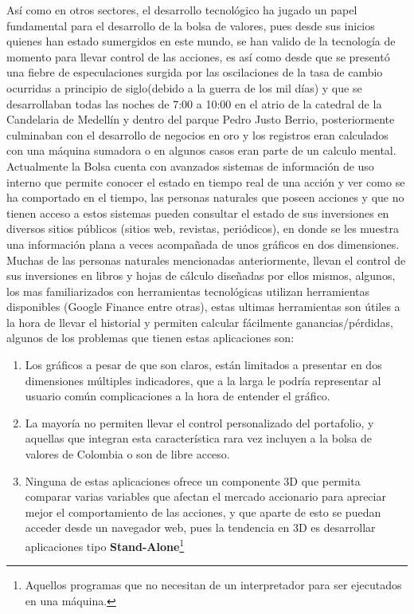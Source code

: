 \documentclass[twocolumn]{article}
\begin{document}
Así como en otros sectores, el desarrollo tecnológico ha jugado un papel fundamental para el desarrollo de la bolsa de valores, pues desde sus inicios quienes han estado sumergidos en este mundo, se han valido de la tecnología de momento para llevar control de las acciones, es así como desde que se presentó una fiebre de especulaciones surgida por las oscilaciones de la tasa de cambio ocurridas a principio de siglo(debido a la guerra de los mil días) y que se desarrollaban todas las noches de 7:00 a 10:00 en el atrio de la catedral de la Candelaria de Medellín y dentro del parque Pedro Justo Berrio\cite{RepEEc:col:piedrahita}, posteriormente culminaban con el desarrollo de negocios en oro y los registros eran calculados con una máquina sumadora o en algunos casos eran parte de un calculo mental. Actualmente la Bolsa cuenta con avanzados sistemas de información de uso interno que permite conocer el estado en tiempo real de una acción y ver como se ha comportado en el tiempo, las personas naturales que poseen acciones y que no tienen acceso a estos sistemas pueden consultar el estado de sus inversiones en diversos sitios públicos (sitios web, revistas, periódicos), en donde se les muestra una información plana a veces acompañada de unos gráficos en dos dimensiones.\\

Muchas de las personas naturales mencionadas anteriormente, llevan el control de sus inversiones en libros y hojas de cálculo diseñadas por ellos mismos, algunos, los mas familiarizados con herramientas tecnológicas utilizan herramientas disponibles (Google Finance entre otras), estas ultimas herramientas son útiles a la hora de llevar el historial y permiten calcular fácilmente ganancias/pérdidas, algunos de los problemas que tienen estas aplicaciones son: 
\begin{enumerate}
\item Los gráficos a pesar de que son claros, están limitados a presentar en dos dimensiones múltiples indicadores, que a la larga le podría representar al usuario común complicaciones a la hora de entender el gráfico.
\item La mayoría no permiten llevar el control personalizado del portafolio, y aquellas que integran esta característica rara vez incluyen a la bolsa de valores de Colombia o son de libre acceso.
\item Ninguna de estas aplicaciones ofrece un componente 3D que permita comparar varias variables que afectan el mercado accionario para apreciar mejor el comportamiento de las acciones, y que aparte de esto se puedan acceder desde un navegador web, pues la tendencia en 3D es desarrollar aplicaciones tipo \textbf{Stand-Alone}\footnote{Aquellos programas que no necesitan de un interpretador para ser ejecutados en una máquina.}
\end{enumerate}
\end{document}
